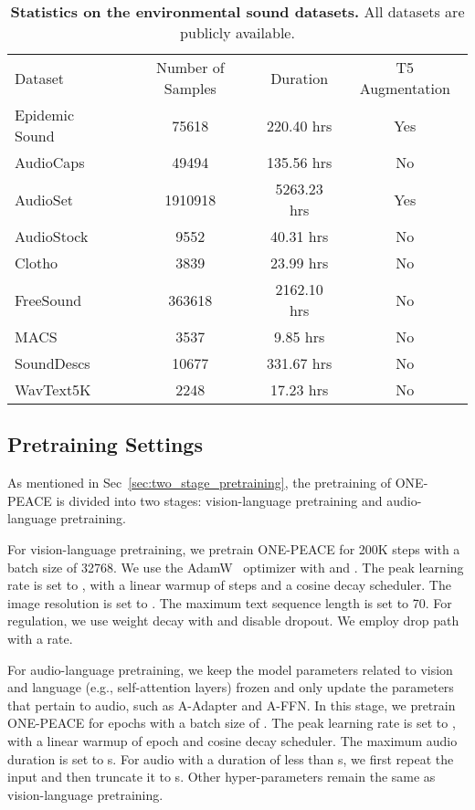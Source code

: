 \documentclass{article}
\newcommand{\onepeace}{ONE-PEACE\xspace}
\newcommand{\normaltablestyle}[2]{\setlength{\tabcolsep}{#1}\renewcommand{\arraystretch}{#2}\centering\normalsize}
\begin{document}
\begin{table*}[h]
\centering
\normaltablestyle{8pt}{1.2}
\begin{tabular}{l|ccc}
  Dataset
  & Number of Samples
  & Duration
  & T5 Augmentation
  \\
  \shline
  Epidemic Sound & 75618 & 220.40 hrs & Yes
  \\ 
  AudioCaps~\cite{audiocaps} & 49494 & 135.56 hrs & No
  \\
  AudioSet~\cite{audioset} & 1910918 & 5263.23 hrs & Yes
  \\
  AudioStock & 9552 & 40.31 hrs & No
  \\
  Clotho~\cite{clotho} & 3839 & 23.99 hrs & No
  \\ 
  FreeSound~\cite{freesound} & 363618 & 2162.10 hrs & No
  \\
  MACS & 3537 & 9.85 hrs & No
  \\ 
  SoundDescs~\cite{sounddescs} & 10677 & 331.67 hrs & No
  \\
  WavText5K~\cite{wavtext5k} & 2248 & 17.23 hrs & No
  \\
\end{tabular}
\caption{\textbf{Statistics on the environmental sound datasets.} All datasets are publicly available.}
\label{tb:audio_dataset}
\end{table*} 
\subsection{Pretraining Settings}
\label{app:pretraining_hyperparameters}









As mentioned in Sec~\ref{sec:two_stage_pretraining}, the pretraining of \onepeace is divided into two stages: vision-language pretraining and audio-language pretraining.

For vision-language pretraining, we pretrain \onepeace for 200K steps with a batch size of 32768. We use the AdamW~\cite{adamw} optimizer with  and . The peak learning rate is set to , with a linear warmup of  steps and a cosine decay scheduler. The image resolution is set to . The maximum text sequence length is set to 70. For regulation, we use weight decay with  and disable dropout. We employ drop path~\cite{drop-path} with a  rate.

For audio-language pretraining, we keep the model parameters related to vision and language (e.g., self-attention layers) frozen and only update the parameters that pertain to audio, such as A-Adapter and A-FFN.
In this stage, we pretrain \onepeace for  epochs with a batch size of . The peak learning rate is set to , with a linear warmup of  epoch and cosine decay scheduler. The maximum audio duration is set to s. For audio with a duration of less than s, we first repeat the input and then truncate it to s.
Other hyper-parameters remain the same as vision-language pretraining.
\end{document}
